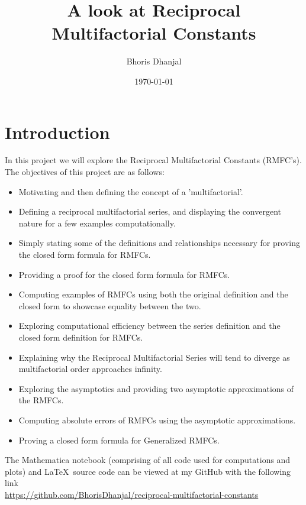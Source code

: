 \documentclass[12pt]{article}
\title{A look at Reciprocal\\ Multifactorial Constants}
\author{Bhoris Dhanjal}
\date{\today}
\numberwithin{equation}{section}
\begin{document}
\tableofcontents
\maketitle


\section{Introduction} %
In this project we will explore the Reciprocal Multifactorial Constants (RMFC's).
The objectives of this project are as follows:
\begin{itemize}
    \item Motivating and then defining the concept of a 'multifactorial'.
    \item Defining a reciprocal multifactorial series, and displaying the convergent nature for a few examples computationally.
    \item Simply stating some of the definitions and relationships necessary for proving the closed form formula for RMFCs.
    \item Providing a proof for the closed form formula for RMFCs.
    \item Computing examples of RMFCs using both the original definition and the closed form to showcase equality between the two.
    \item Exploring computational efficiency between the series definition and the closed form definition for RMFCs.
    \item Explaining why the Reciprocal Multifactorial Series will tend to diverge as multifactorial order approaches infinity. 
    \item Exploring the asymptotics and providing two asymptotic approximations of the RMFCs.
    \item Computing absolute errors of RMFCs using the asymptotic approximations.
    \item Proving a closed form formula for Generalized RMFCs.
\end{itemize}\par
The Mathematica notebook (comprising of all code used for computations and plots) and \LaTeX \ source code can be viewed at my GitHub with the following link\\
\href{https://github.com/BhorisDhanjal/reciprocal-multifactorial-constants}{\faGithubSquare} \href{https://github.com/BhorisDhanjal/reciprocral-multifactorial-constants}{https://github.com/BhorisDhanjal/reciprocal-multifactorial-constants}
\vfill
\end{document}
